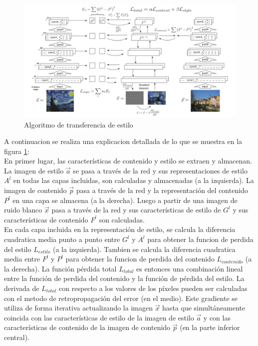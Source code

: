 \documentclass[a4paper,11pt,spanish]{book}
\begin{document}
      \begin{figure}[h]
	\includegraphics[width=\textwidth]{./img/gatys_method.png}
	\caption{Algoritmo de transferencia de estilo}
	\label{fig:gatys_generacion}
      \end{figure}
	A continuacion se realiza una explicacion detallada de lo que se muestra en la figura \ref{fig:gatys_generacion}: \\
	En primer lugar, las características de contenido y estilo se extraen y almacenan. La imagen de estilo $\overrightarrow{a}$ se pasa a través de la red
	y sus representaciones de estilo $A^l$ en todas las capas incluidas, son calculadas y almacenadas (a la izquierda). La imagen de contenido $\overrightarrow{p}$ pasa a través 
	de la red y la representación del contenido $P^l$ en una capa se almacena (a la derecha). Luego a partir de una imagen de ruido blanco $\overrightarrow{x}$ pasa a través de la red y sus
	características de estilo de $G^l$ y sus características de contenido $F^l$ son calculadas. \\
	En cada capa incluida en la representación de estilo, se calcula la diferencia cuadratica media punto a punto entre $G^l$ y $A^l$ para obtener la funcion de perdida del estilo
	$L_{estilo}$ (a la izquierda). Tambien se calcula la diferencia cuadratica media entre $F^l$ y $P^l$ para obtener la funcion de perdida del contenido $L_{contenido}$ (a la derecha).
	La función pérdida total $L_{total}$ es entonces una combinación lineal entre la función de perdida del contenido y la función de pérdida del estilo.
	La derivada de  $L_{total}$ con respecto a los valores de los píxeles pueden ser calculadas con el metodo  de retropropagación del error (en el medio). 
	Este gradiente se utiliza de forma iterativa actualizando la imagen $\overrightarrow{x}$ hasta que simultáneamente coincida con las características de estilo de la imagen 
	de estilo $\overrightarrow{a}$ y con las características de contenido de la imagen de contenido $\overrightarrow{p}$ (en la parte inferior central).
\end{document}
